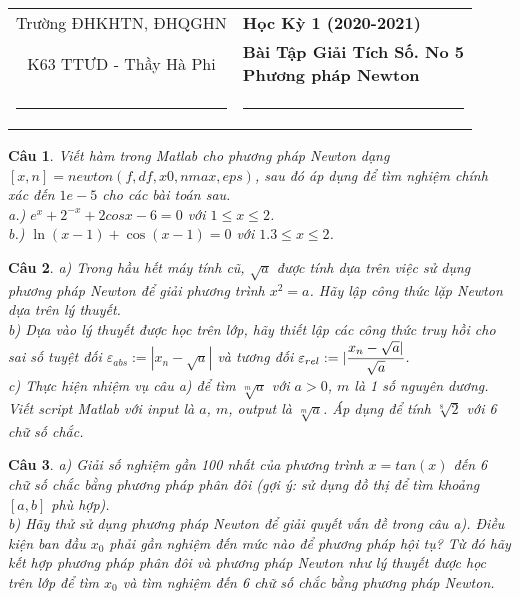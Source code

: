 \documentclass[11pt]{article}
\newtheorem{bt}{Câu}
\begin{document}
\begin{tabular*}
{\linewidth}{c>{\centering\hspace{0pt}} p{}}
Trường ĐHKHTN, ĐHQGHN & {\bf Học Kỳ 1 (2020-2021)}
\tabularnewline
K63 TTƯD - Thầy Hà Phi & {\bf Bài Tập Giải Tích Số. No 5 \\ Phương pháp Newton}
\tabularnewline
\rule{1in}{1pt}  \small  & \rule{2in}{1pt} %
\tabularnewline

\end{tabular*}
%

\begin{bt} %
Viết hàm trong Matlab cho phương pháp Newton dạng $[x,n] = newton(f,df,x0,nmax,eps)$, sau đó áp dụng để tìm nghiệm chính xác đến $1e-5$ cho các bài toán sau.\\
a.) $e^x + 2^{-x} + 2 cos x - 6 = 0$ với $1 \leq x \leq 2$. \\
b.) $\ln(x - 1) + \cos(x - 1) = 0$ với $1.3 \leq x \leq 2$.
\end{bt}

\begin{bt} %
a) Trong hầu hết máy tính cũ, $\sqrt{a}$ được tính dựa trên việc sử dụng phương pháp Newton để giải phương trình $x^2=a$. Hãy lập công thức lặp Newton dựa trên lý thuyết.  \\
b) Dựa vào lý thuyết được học trên lớp, hãy thiết lập các công thức truy hồi cho sai số tuyệt đối $\varepsilon_{abs}:=|x_n-\sqrt{a}|$ và tương đối $\varepsilon_{rel}:=|\cfrac{x_n-\sqrt{a}|}{\sqrt{a}}$.\\
c) Thực hiện nhiệm vụ câu a) để tìm $\sqrt[m]{a}$ với $a>0$, $m$ là 1 số nguyên dương. Viết script Matlab với input là $a$, $m$, output là $\sqrt[m]{a}$. Áp dụng để tính $\sqrt[8]{2}$ với 6 chữ số chắc.
\end{bt}

\begin{bt} %
a) Giải số nghiệm gần 100 nhất của phương trình $x=tan(x)$ đến 6 chữ số chắc bằng phương pháp phân đôi (gợi ý: sử dụng đồ thị để tìm khoảng $[a,b]$ phù hợp). \\
b) Hãy thử sử dụng phương pháp Newton để giải quyết vấn đề trong câu a). Điều kiện ban đầu $x_0$ phải gần nghiệm đến mức nào để phương pháp hội tụ? Từ đó hãy kết hợp phương pháp phân đôi và phương pháp Newton như lý thuyết được học trên lớp để tìm $x_0$ và tìm nghiệm đến 6 chữ số chắc bằng phương pháp Newton.
\end{bt}
\end{document}
